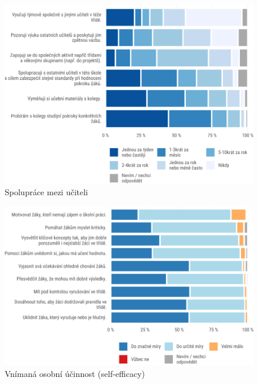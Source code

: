 \documentclass[12pt,a4paper,]{report}
\begin{document}
\begin{figure}

{\centering \includegraphics[width=\textwidth]{figs/tots2q1T3COOPappdx-1} 

}

\caption{Spolupráce mezi učiteli}\label{fig:tots2q1T3COOPappdx}
\end{figure}

\begin{figure}

{\centering \includegraphics[width=\textwidth]{figs/tots2q2T3SELFappdx-1} 

}

\caption{Vnímaná osobní účinnost (self-efficacy)}\label{fig:tots2q2T3SELFappdx}
\end{figure}
\end{document}
